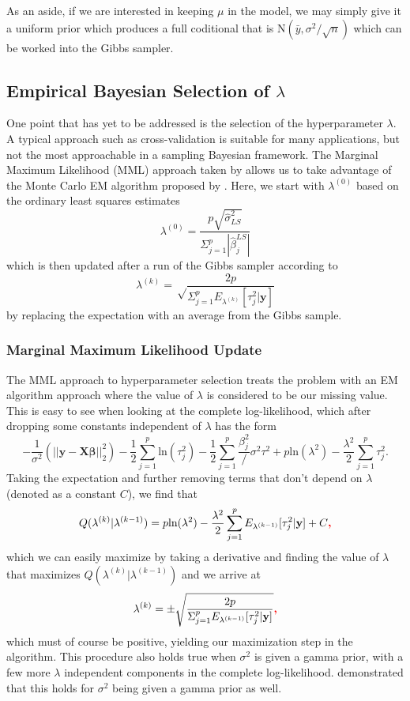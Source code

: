 \documentclass{uwstat572}
\newcommand{\vmadd}[1]{\textbf{\color{red}{#1}}}
\begin{document}
As an aside, if we are interested in keeping $\mu$ in the model, we may simply give it a uniform prior which produces a full coditional that is $\text{N}(\bar{y},\sigma^2/\sqrt{n})$ which can be worked into the Gibbs sampler.

\subsection{Empirical Bayesian Selection of $\lambda$}
One point that has yet to be addressed is the selection of the hyperparameter $\lambda$. A typical approach such as cross-validation is suitable for many applications, but not the most approachable in a sampling Bayesian framework. The Marginal Maximum Likelihood (MML) approach taken by \cite{park2008bayesian} allows us to take advantage of the Monte Carlo EM algorithm proposed by \cite{casella2001empirical}. Here, we start with $\lambda^{(0)}$ based on the ordinary least squares estimates \[ 
\lambda^{(0)}=\frac{p\sqrt{\hat\sigma^2_{LS}}}{\Sigma^p_{j=1}|\hat\beta_j^{LS}|} 
\] which is then updated after a run of the Gibbs sampler according to \[ 
\lambda^{(k)}=\sqrt\frac{2p}{\Sigma^p_{j=1}E_{\lambda^{(k)}}[\tau^2_j|\mathbf{y}]}
\] by replacing the expectation with an average from the Gibbs sample. 

\subsubsection{Marginal Maximum Likelihood Update}
The MML approach to hyperparameter selection treats the problem with an EM algorithm approach where the value of $\lambda$ is considered to be our missing value. This is easy to see when looking at the complete log-likelihood, which after dropping some constants independent of $\lambda$ has the form \[
-\frac{1}{\sigma^2}(||\mathbf{y}-\mathbf{X}\boldsymbol\beta||^2_2)-\frac{1}{2}\sum^p_{j=1}\text{ln}(\tau_j^2)-\frac{1}{2}\sum^p_{j=1}\frac{\beta^2_j}/\sigma^2\tau^2+p\text{ln}(\lambda^2)-\frac{\lambda^2}{2}\sum^p_{j=1}\tau^2_j.
\] Taking the expectation and further removing terms that don't depend on $\lambda$ (denoted as a constant $C$), we find that \[
Q(\lambda^{(k)}|\lambda^{(k-1)})=p\text{ln}(\lambda^2)-\frac{\lambda^2}{2}\sum^p_{j=1}E_{\lambda^{(k-1)}}[\tau^2_j|\mathbf{y}]+C\vmadd{,}
\] which we can easily maximize by taking a derivative and finding the value of $\lambda$ that maximizes $Q(\lambda^{(k)}|\lambda^{(k-1)})$ and we arrive at 
\[
\lambda^{(k)}=\pm\sqrt{\frac{2p}{\Sigma^p_{j=1}E_{\lambda^{(k-1)}}[\tau^2_j|\mathbf{y}]}}\vmadd{,}
\] which must of course be positive, yielding our maximization step in the algorithm. This procedure also holds true when $\sigma^2$ is given a gamma prior, with a few more $\lambda$ independent components in the complete log-likelihood. \cite{park2008bayesian} demonstrated that this holds for $\sigma^2$ being given a gamma prior as well.
\end{document}
